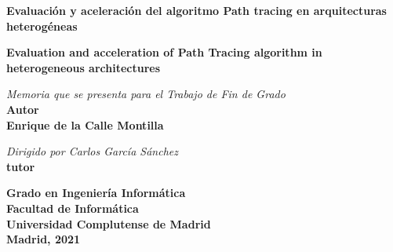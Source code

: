 \begin{titlepage}
\vspace{4cm}
\centering
{\textsf{\huge  \textbf{Evaluación y aceleración del algoritmo Path tracing en arquitecturas heterogéneas
}}}

\vspace{0.3cm}

{\textsf{\large \textbf{Evaluation and acceleration of Path Tracing algorithm in heterogeneous architectures
} }}

\print

\vspace{7cm}
\textit{Memoria que se presenta para el Trabajo de Fin de Grado}\\
\vspace{5mm}
{\large \textbf{Autor \\
Enrique de la Calle Montilla}}

\vspace{2cm}
\textit{Dirigido por Carlos García Sánchez}\\
\vspace{5mm}
{\bfseries tutor}

\vfill

\textbf{{Grado en Ingeniería Informática\\
Facultad de Informática\\
Universidad Complutense de Madrid}}\\
\vspace{5mm}
\textbf{Madrid, 2021}
\end{titlepage}